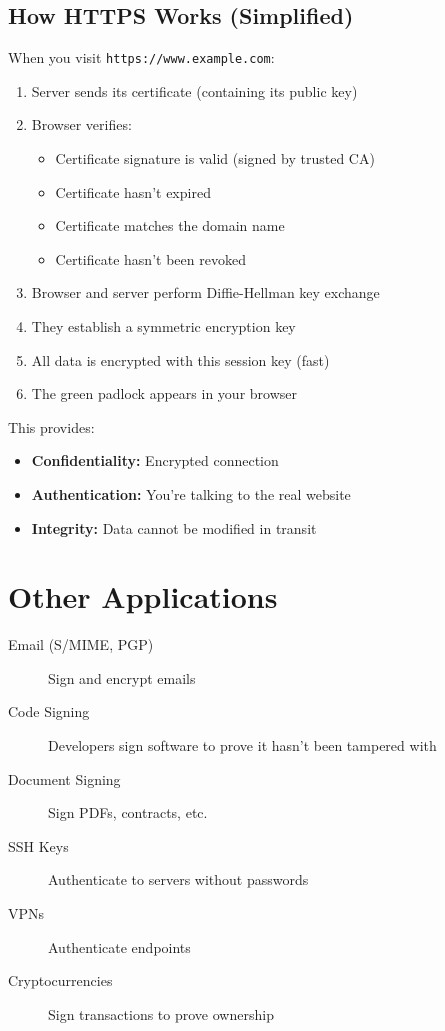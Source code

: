 \documentclass[11pt,a4paper]{report}
\begin{document}
\subsection{How HTTPS Works (Simplified)}

When you visit \texttt{https://www.example.com}:

\begin{enumerate}
\item Server sends its certificate (containing its public key)
\item Browser verifies:
   \begin{itemize}
   \item Certificate signature is valid (signed by trusted CA)
   \item Certificate hasn't expired
   \item Certificate matches the domain name
   \item Certificate hasn't been revoked
   \end{itemize}
\item Browser and server perform Diffie-Hellman key exchange
\item They establish a symmetric encryption key
\item All data is encrypted with this session key (fast)
\item The green padlock appears in your browser
\end{enumerate}

This provides:
\begin{itemize}
\item \textbf{Confidentiality:} Encrypted connection
\item \textbf{Authentication:} You're talking to the real website
\item \textbf{Integrity:} Data cannot be modified in transit
\end{itemize}

\section{Other Applications}

\begin{description}
\item[Email (S/MIME, PGP)] Sign and encrypt emails

\item[Code Signing] Developers sign software to prove it hasn't been tampered with

\item[Document Signing] Sign PDFs, contracts, etc.

\item[SSH Keys] Authenticate to servers without passwords

\item[VPNs] Authenticate endpoints

\item[Cryptocurrencies] Sign transactions to prove ownership
\end{description}
\end{document}
